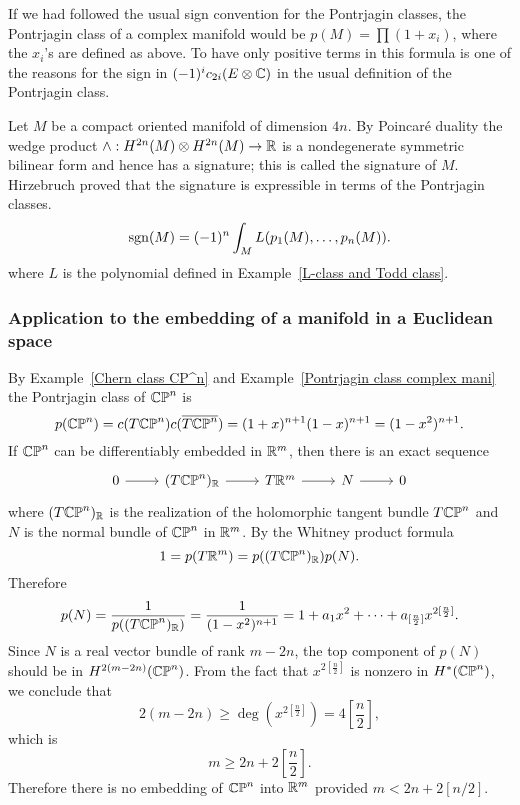 \begin{remark}
If we had followed the usual sign convention for the Pontrjagin classes, the Pontrjagin class of a complex manifold would be $p(M)=\prod(1+x_i)$, where the $x_i$'s are 
defined as above. To have only positive terms in this formula is one of the reasons for the sign in $(-1)^ic_{2i}(E\otimes\mathbb{C})$ in the usual definition of the Pontrjagin 
class.
\end{remark}
\begin{remark}
Let $M$ be a compact oriented manifold of dimension $4n$. By Poincar\'e duality the wedge product $\wedge:H^{2n}(M)\otimes H^{2n}(M)\to\mathbb{R}$ is a nondegenerate symmetric 
bilinear form and hence has a signature; this is called the signature of $M$. Hirzebruch proved that the signature is expressible in terms of the Pontrjagin classes.
\[\mathrm{sgn}(M)=(-1)^n\int_ML(p_1(M),\dots,p_n(M)).\]
where $L$ is the polynomial defined in Example~\ref{L-class and Todd class}.
\end{remark}
\subsubsection{Application to the embedding of a manifold in a Euclidean space}
\begin{example}
By Example~\ref{Chern class CP^n} and Example~\ref{Pontrjagin class complex mani} the Pontrjagin class of $\mathbb{CP}^n$ is
\[p(\mathbb{CP}^n)=c(T\mathbb{CP}^n)c(\overline{T\mathbb{CP}^n})=(1+x)^{n+1}(1-x)^{n+1}=(1-x^2)^{n+1}.\]
If $\mathbb{CP}^n$ can be differentiably embedded in $\mathbb{R}^m$, then there is an exact sequence
\[\begin{tikzcd}
0\ar[r]&(T\CP^n)_{\R}\ar[r]&T\R^{m}\ar[r]&N\ar[r]&0
\end{tikzcd}\]
where $(T\mathbb{CP}^n)_{\mathbb{R}}$ is the realization of the holomorphic tangent bundle $T\mathbb{CP}^n$ and $N$ is the normal bundle of $\mathbb{CP}^n$ in $\mathbb{R}^m$. By the Whitney product formula
\[1=p(T\mathbb{R}^m)=p((T\mathbb{CP}^n)_{\mathbb{R}})p(N).\]
Therefore
\[p(N)=\frac{1}{p((T\mathbb{CP}^n)_{\mathbb{R}})}=\frac{1}{(1-x^2)^{n+1}}=1+a_1x^2+\cdots+a_{[\frac{n}{2}]}x^{2[\frac{n}{2}]}.\]
Since $N$ is a real vector bundle of rank $m-2n$, the top component of $p(N)$ should be in $H^{2(m-2n)}(\mathbb{CP}^n)$. From the fact that $x^{2[\frac{n}{2}]}$ is nonzero 
in $H^*(\mathbb{CP}^n)$, we conclude that
\[2(m-2n)\geq\deg(x^{2[\frac{n}{2}]})=4[\frac{n}{2}],\]
which is
\[m\geq 2n+2[\frac{n}{2}].\]
Therefore there is no embedding of $\mathbb{CP}^n$ into $\mathbb{R}^m$ provided $m<2n+2[n/2]$.
\end{example}

